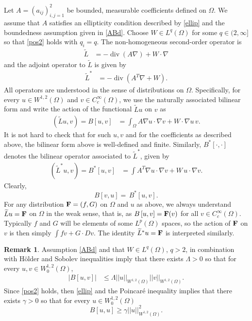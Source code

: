 \documentclass[12pt,reqno]{amsart}
\theoremstyle{plain}
\theoremstyle{definition}
\newtheorem*{rem}{Remark}
\newcommand{\disp}{\displaystyle}
\DeclareMathOperator{\di}{div}
\newcommand{\ga}{\gamma}
\newcommand{\La}{\Lambda}
\newcommand{\Om}{\Omega}
\newcommand{\iny}{\infty}
\newcommand{\gr}{\nabla}
\newcommand{\norm}[1]{\left\vert \left\vert #1\right\vert\right\vert}
\newcommand{\brac}[1]{\left[#1\right]}
\newcommand{\pr}[1]{\left( #1 \right) }
\begin{document}
\begin{appendix}
Let $A = \pr{a_{ij}}_{i, j= 1}^{2}$ be bounded, measurable coefficients defined on $\Om$.
We assume that $A$ satisfies an ellipticity condition described by \eqref{ellip} and the boundedness assumption given in \eqref{ABd}.
Choose $W \in L^q\pr{\Om}$ for some $q \in (2, \iny]$ so that \eqref{pos2} holds with $q_i = q$.
The non-homogeneous second-order operator is
\begin{align}
\widetilde{L} 
&= -\di \pr{A \gr} + W \cdot \gr 
\label{eqB.2}
\end{align}
and the adjoint operator to $\widetilde{L}$ is given by
\begin{align}
\widetilde{L}^*
&= -\di \pr{A^T \gr + W} .
\label{eqB.3}
\end{align}
All operators are understood in the sense of distributions on $\Omega$. 
Specifically, for every $u \in W^{1,2}\pr{\Om}$ and $v \in C_c^\infty\pr{\Om}$, we use the naturally associated bilinear form and write the action of the functional ${\widetilde L}u$ on $v$ as
\begin{align}
({\widetilde L}u, v)={B}\brac{u, v} 
&= \int_\Om A \gr u \cdot \gr v + W \cdot \gr u \, v .
\label{eqB.4}
\end{align}
It is not hard to check that for such $u, v$ and for the coefficients as described above, the bilinear form above is well-defined and finite.  
Similarly, ${B}^*\brac{\cdot, \cdot}$ denotes the bilinear operator associated to $\widetilde{L}^*$, given by
\begin{align}
({\widetilde L}^*u, v)={B}^*\brac{u, v} 
&= \int  A^T \gr u \cdot \gr v + W \, u \cdot \gr v .
\label{eqB.5}
\end{align}
Clearly,
\begin{equation}
{B}\brac{v,u}=\, {B}^*\brac{u,v}.
\label{eqB.6}
\end{equation}
For any distribution ${\bf F} = \pr{f, G}$ on $\Omega$ and $u$ as above, we always understand $\widetilde{ L}u= \bf F $ on $\Omega$ in the weak sense, that is, as ${B}\brac{u,v}= {\bf F}(v)$ for all $v\in C_c^\infty\pr{\Om}$. 
Typically $f$ and $G$ will be elements of some $L^p(\Omega)$ spaces, so the action of $\bf F$ on $v$ is then simply $\disp \int f v + G \cdot Dv.$ 
The identity $\widetilde{ L}^*u= \bf F $ is interpreted similarly.

\begin{rem}
Assumption \eqref{ABd} and that $W \in L^q\pr{\Om}$, $q > 2$, in combination with H\"older and Sobolev inequalities imply that there exists $\La > 0$ so that for every $u, v \in W^{1,2}_0\pr{\Om}$,
\begin{align}
|{B}\brac{u, v}| &\le \La \norm{u}_{W^{1,2}\pr{\Om}} \norm{v}_{W^{1,2}\pr{\Om}}.
\label{eqB.7}
\end{align}
Since \eqref{pos2} holds, then \eqref{ellip} and the Poincar\'e inequality implies that there exists $\ga > 0$ so that for every $u \in W^{1,2}_0\pr{\Om}$
\begin{equation}
{B}\brac{u, u} \ge \ga \norm{u}_{W^{1,2}\pr{\Om}}^2.
\label{eqB.8}
\end{equation}
\end{rem}


\end{appendix}
\end{document}
